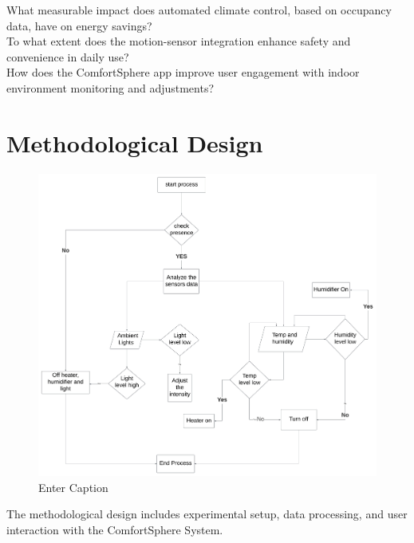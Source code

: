 \documentclass{article}
\begin{document}
What measurable impact does automated climate control, based on occupancy data, have on energy savings?\\

To what extent does the motion-sensor integration enhance safety and convenience in daily use?\\

How does the ComfortSphere app improve user engagement with indoor environment monitoring and adjustments?\\

\section{Methodological Design}
\begin{figure}
    \centering
    \includegraphics[width=0.5\linewidth]{diagram.jpg.png}
    \caption{Enter Caption}
    \label{fig:enter-label}
\end{figure}
The methodological design includes experimental setup, data processing, and user interaction with the ComfortSphere System.\\
\end{document}
